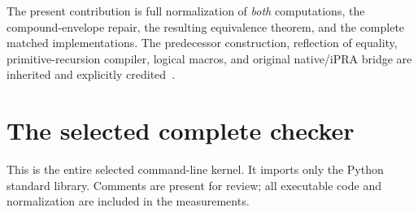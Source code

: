 \documentclass[11pt,letterpaper]{article}
\theoremstyle{definition}
\theoremstyle{remark}
\begin{document}
The present contribution is full normalization of \emph{both} computations,
the compound-envelope repair, the resulting equivalence theorem, and the
complete matched implementations. The predecessor construction, reflection
of equality, primitive-recursion compiler, logical macros, and original
native/iPRA bridge are inherited and explicitly credited~\cite{basis,bridge,erasure,forward,progress}.







\clearpage
\section{The selected complete checker}
\label{app:checker}
This is the entire selected command-line kernel. It imports only the Python
standard library. Comments are present for review; all executable code and
normalization are included in the measurements.

\end{document}
